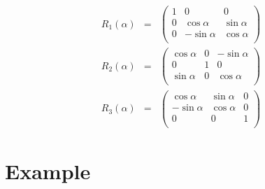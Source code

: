 \documentclass[10pt,preprint]{aastex}
\begin{document}
\begin{eqnarray}
R_1(\alpha) &=&
\left(\begin{array}{ccc}
1 & 0 & 0 \\
0 & \cos\alpha & \sin\alpha \\
0 & -\sin\alpha & \cos\alpha \\
\end{array}\right)
\\
R_2(\alpha) &=&
\left(\begin{array}{ccc}
\cos\alpha & 0 & -\sin\alpha \\
0 & 1 & 0 \\
\sin\alpha & 0 & \cos\alpha \\
\end{array}\right)
\\
R_3(\alpha) &=&
\left(\begin{array}{ccc}
\cos\alpha & \sin\alpha & 0 \\
-\sin\alpha & \cos\alpha & 0 \\
0 & 0 & 1 \\
\end{array}\right)
\end{eqnarray}

\section{Example}
\end{document}
